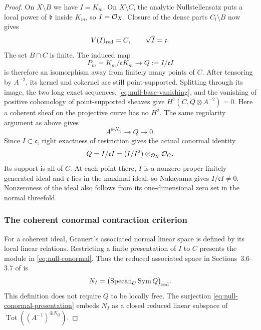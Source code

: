 \begin{proof}
On \(X\setminus B\) we have \(I=K_m\).  On \(X\setminus C\), the analytic
Nullstellensatz puts a local power of \(\mathfrak b\) inside \(K_m\),
so \(I=\mathcal O_X\).  Closure of the dense parts \(C_l\setminus B\) now gives
\[
 V(I)_{\mathrm{red}}=C,\qquad \sqrt I=\mathfrak c .
\]
The set \(B\cap C\) is finite.  The induced map
\[
 P_m=K_m/\mathfrak cK_m\longrightarrow Q:=I/\mathfrak cI
\]
is therefore an isomorphism away from finitely many points of \(C\).
After tensoring by \(A^{-2}\), its kernel and cokernel are still
point-supported.  Splitting through its image, the two long exact
sequences, \eqref{eq:null-base-vanishing}, and the vanishing of positive
cohomology of point-supported sheaves give
\(H^1(C,Q\otimes A^{-2})=0\).  Here a coherent sheaf on the projective
curve has no \(H^2\).  The same regularity argument as above gives
\begin{equation}\label{eq:null-conormal-presentation}
 A^{\oplus N_Q}\longrightarrow Q\longrightarrow0 .
\end{equation}
Since \(I\subset\mathfrak c\), right exactness of restriction gives the
actual conormal identity
\begin{equation}\label{eq:null-conormal}
 Q=I/\mathfrak cI=(I/I^2)\otimes_{\mathcal O_X}\mathcal O_C .
\end{equation}
Its support is all of \(C\).  At each point there, \(I\) is a nonzero
proper finitely generated ideal and \(\mathfrak c\) lies in the maximal ideal, so
Nakayama gives \(I/\mathfrak cI\ne0\).  Nonzeroness of the ideal also
follows from its one-dimensional zero set in the normal threefold.

\subsubsection*{The coherent conormal contraction criterion}

For a coherent ideal, Grauert's associated normal linear space is
defined by its local linear relations.  Restricting a finite presentation
of \(I\) to \(C\) presents the module in \eqref{eq:null-conormal}.
Thus the reduced associated space in Sections~3.6--3.7 of
\cite{Grauert1962} is
\[
 N_I=\bigl(\operatorname{Specan}_C\operatorname{Sym}Q\bigr)_{\mathrm{red}}.
\]
This definition does not require \(Q\) to be locally free.  The
surjection \eqref{eq:null-conormal-presentation} embeds \(N_I\) as a
closed reduced linear subspace of
\(\operatorname{Tot}((A^{-1})^{\oplus N_Q})\).


\end{proof}
